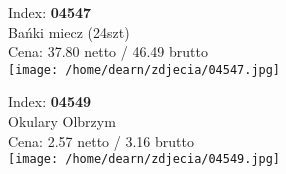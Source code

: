 {Index: \textbf{04547}\\
Bańki miecz (24szt)\\
Cena: 37.80 netto / 46.49 brutto\\
  \texttt{[image: /home/dearn/zdjecia/04547.jpg]}}\newline\newline

{Index: \textbf{04549}\\
Okulary Olbrzym\\
Cena: 2.57 netto / 3.16 brutto\\
  \texttt{[image: /home/dearn/zdjecia/04549.jpg]}}\newline\newline
